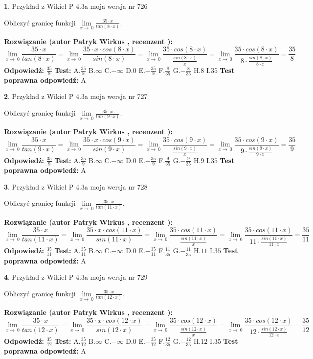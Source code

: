 \documentclass[12pt, a4paper]{article}
\theoremstyle{definition} %
\newtheorem{zad}{}
\newcommand{\zadStart}[1]{\begin{zad}#1\newline}
\newcommand{\zadStop}{\end{zad}}
\newcommand{\rozwStart}[2]{\noindent \textbf{Rozwiązanie (autor #1 , recenzent #2): }\newline}
\newcommand{\rozwStop}{\newline}
\newcommand{\odpStart}{\noindent \textbf{Odpowiedź:}\newline}
\newcommand{\odpStop}{\newline}
\newcommand{\testStart}{\noindent \textbf{Test:}\newline}
\newcommand{\testStop}{\newline}
\newcommand{\kluczStart}{\noindent \textbf{Test poprawna odpowiedź:}\newline}
\newcommand{\kluczStop}{\newline}
\begin{document}
\zadStart{Przykład z Wikieł P 4.3a moja wersja nr 726}


Obliczyć granicę funkcji $\lim\limits_{x\to\ 0}\frac{35 \cdot x}{tan(8 \cdot x)}$.
\zadStop
\rozwStart{Patryk Wirkus}{}
$$\lim\limits_{x\to\ 0}\frac{35 \cdot x}{tan(8 \cdot x)}=\lim\limits_{x\to\ 0}\frac{35 \cdot x \cdot cos(8 \cdot x)}{sin(8 \cdot x)}=\lim\limits_{x\to\ 0}\frac{35 \cdot cos(8 \cdot x)}{\frac{sin(8 \cdot x)}{x}}=\lim\limits_{x\to\ 0}\frac{35 \cdot cos(8 \cdot x)}{8 \cdot \frac{sin(8 \cdot x)}{8 \cdot x}} = \frac{35}{8}$$
\rozwStop
\odpStart
$\frac{35}{8}$
\odpStop
\testStart
A.$\frac{35}{8}$
B.$\infty$
C.$-\infty$
D.$0$
E.$-\frac{35}{8}$
F.$\frac{8}{35}$
G.$-\frac{8}{35}$
H.$8$
I.$35$
\testStop
\kluczStart
A
\kluczStop



\zadStart{Przykład z Wikieł P 4.3a moja wersja nr 727}


Obliczyć granicę funkcji $\lim\limits_{x\to\ 0}\frac{35 \cdot x}{tan(9 \cdot x)}$.
\zadStop
\rozwStart{Patryk Wirkus}{}
$$\lim\limits_{x\to\ 0}\frac{35 \cdot x}{tan(9 \cdot x)}=\lim\limits_{x\to\ 0}\frac{35 \cdot x \cdot cos(9 \cdot x)}{sin(9 \cdot x)}=\lim\limits_{x\to\ 0}\frac{35 \cdot cos(9 \cdot x)}{\frac{sin(9 \cdot x)}{x}}=\lim\limits_{x\to\ 0}\frac{35 \cdot cos(9 \cdot x)}{9 \cdot \frac{sin(9 \cdot x)}{9 \cdot x}} = \frac{35}{9}$$
\rozwStop
\odpStart
$\frac{35}{9}$
\odpStop
\testStart
A.$\frac{35}{9}$
B.$\infty$
C.$-\infty$
D.$0$
E.$-\frac{35}{9}$
F.$\frac{9}{35}$
G.$-\frac{9}{35}$
H.$9$
I.$35$
\testStop
\kluczStart
A
\kluczStop



\zadStart{Przykład z Wikieł P 4.3a moja wersja nr 728}


Obliczyć granicę funkcji $\lim\limits_{x\to\ 0}\frac{35 \cdot x}{tan(11 \cdot x)}$.
\zadStop
\rozwStart{Patryk Wirkus}{}
$$\lim\limits_{x\to\ 0}\frac{35 \cdot x}{tan(11 \cdot x)}=\lim\limits_{x\to\ 0}\frac{35 \cdot x \cdot cos(11 \cdot x)}{sin(11 \cdot x)}=\lim\limits_{x\to\ 0}\frac{35 \cdot cos(11 \cdot x)}{\frac{sin(11 \cdot x)}{x}}=\lim\limits_{x\to\ 0}\frac{35 \cdot cos(11 \cdot x)}{11 \cdot \frac{sin(11 \cdot x)}{11 \cdot x}} = \frac{35}{11}$$
\rozwStop
\odpStart
$\frac{35}{11}$
\odpStop
\testStart
A.$\frac{35}{11}$
B.$\infty$
C.$-\infty$
D.$0$
E.$-\frac{35}{11}$
F.$\frac{11}{35}$
G.$-\frac{11}{35}$
H.$11$
I.$35$
\testStop
\kluczStart
A
\kluczStop



\zadStart{Przykład z Wikieł P 4.3a moja wersja nr 729}


Obliczyć granicę funkcji $\lim\limits_{x\to\ 0}\frac{35 \cdot x}{tan(12 \cdot x)}$.
\zadStop
\rozwStart{Patryk Wirkus}{}
$$\lim\limits_{x\to\ 0}\frac{35 \cdot x}{tan(12 \cdot x)}=\lim\limits_{x\to\ 0}\frac{35 \cdot x \cdot cos(12 \cdot x)}{sin(12 \cdot x)}=\lim\limits_{x\to\ 0}\frac{35 \cdot cos(12 \cdot x)}{\frac{sin(12 \cdot x)}{x}}=\lim\limits_{x\to\ 0}\frac{35 \cdot cos(12 \cdot x)}{12 \cdot \frac{sin(12 \cdot x)}{12 \cdot x}} = \frac{35}{12}$$
\rozwStop
\odpStart
$\frac{35}{12}$
\odpStop
\testStart
A.$\frac{35}{12}$
B.$\infty$
C.$-\infty$
D.$0$
E.$-\frac{35}{12}$
F.$\frac{12}{35}$
G.$-\frac{12}{35}$
H.$12$
I.$35$
\testStop
\kluczStart
A
\kluczStop
\end{document}
